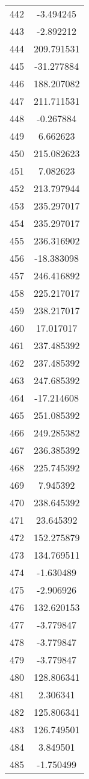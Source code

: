 \documentclass[12pt]{article}
\begin{document}
\begin{longtable}{@{}cc@{}}
442 & -3.494245 \\
443 & -2.892212 \\
444 & 209.791531 \\
445 & -31.277884 \\
446 & 188.207082 \\
447 & 211.711531 \\
448 & -0.267884 \\
449 & 6.662623 \\
450 & 215.082623 \\
451 & 7.082623 \\
452 & 213.797944 \\
453 & 235.297017 \\
454 & 235.297017 \\
455 & 236.316902 \\
456 & -18.383098 \\
457 & 246.416892 \\
458 & 225.217017 \\
459 & 238.217017 \\
460 & 17.017017 \\
461 & 237.485392 \\
462 & 237.485392 \\
463 & 247.685392 \\
464 & -17.214608 \\
465 & 251.085392 \\
466 & 249.285382 \\
467 & 236.385392 \\
468 & 225.745392 \\
469 & 7.945392 \\
470 & 238.645392 \\
471 & 23.645392 \\
472 & 152.275879 \\
473 & 134.769511 \\
474 & -1.630489 \\
475 & -2.906926 \\
476 & 132.620153 \\
477 & -3.779847 \\
478 & -3.779847 \\
479 & -3.779847 \\
480 & 128.806341 \\
481 & 2.306341 \\
482 & 125.806341 \\
483 & 126.749501 \\
484 & 3.849501 \\
485 & -1.750499 \\

\end{longtable}
\end{document}
